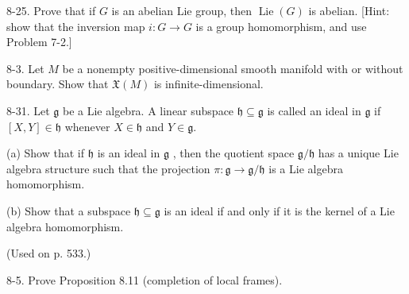 \begin{exercise}
\label{prob:8-25}


8-25. Prove that if $G$ is an abelian Lie group, then $\operatorname{Lie}\left( G\right)$ is abelian. [Hint: show that the inversion map $i : G \rightarrow  G$ is a group homomorphism, and use Problem 7-2.]
\end{exercise}

\begin{exercise}
\label{prob:8-3}


8-3. Let $M$ be a nonempty positive-dimensional smooth manifold with or without boundary. Show that $\mathfrak{X}\left( M\right)$ is infinite-dimensional.
\end{exercise}

\begin{exercise}
\label{prob:8-31}


8-31. Let $\mathfrak{g}$ be a Lie algebra. A linear subspace $\mathfrak{h} \subseteq  \mathfrak{g}$ is called an ideal in $\mathfrak{g}$ if $\left\lbrack  {X, Y}\right\rbrack   \in  \mathfrak{h}$ whenever $X \in  \mathfrak{h}$ and $Y \in  \mathfrak{g}.$

(a) Show that if $\mathfrak{h}$ is an ideal in $\mathfrak{g}$ , then the quotient space $\mathfrak{g}/\mathfrak{h}$ has a unique Lie algebra structure such that the projection $\pi  : \mathfrak{g} \rightarrow  \mathfrak{g}/\mathfrak{h}$ is a Lie algebra homomorphism.

(b) Show that a subspace $\mathfrak{h} \subseteq  \mathfrak{g}$ is an ideal if and only if it is the kernel of a Lie algebra homomorphism.

(Used on p. 533.)
\end{exercise}

\begin{exercise}
\label{prob:8-5}


8-5. Prove Proposition 8.11 (completion of local frames).
\end{exercise}

